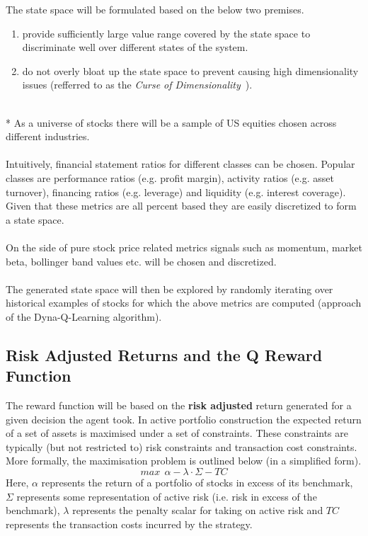 \documentclass[dvips,12pt]{article}
\begin{document}
The state space will be formulated based on the below two premises.
\begin{enumerate}
	\item provide sufficiently large value range covered by the state space to discriminate well over different states of the system.
	\item do not overly bloat up the state space to prevent causing high dimensionality issues (refferred to as the \emph{Curse of Dimensionality}~\cite{rojas2015}).
\end{enumerate}
~\\*
As a universe of stocks there will be a sample of US equities chosen across different industries.
\\\\
Intuitively, financial statement ratios for different classes can be chosen. Popular classes are performance ratios (e.g. profit margin), activity ratios (e.g. asset turnover), financing ratios (e.g. leverage) and liquidity (e.g. interest coverage). Given that these metrics are all percent based they are easily discretized to form a state space.
\\\\
On the side of pure stock price related metrics signals such as momentum, market beta, bollinger band values etc. will be chosen and discretized.
\\\\
The generated state space will then be explored by randomly iterating over historical examples of stocks for which the above metrics are computed (approach of the Dyna-Q-Learning algorithm). 

\subsection*{Risk Adjusted Returns and the Q Reward Function}
The reward function will be based on the \textbf{risk adjusted} return generated for a given decision the agent took.
In active portfolio construction the expected return of a set of assets is maximised under a set of constraints. These constraints are typically (but not restricted to) risk constraints and transaction cost constraints. More formally, the maximisation problem is outlined below (in a simplified form)\cite{grinoldkahn1999}.
\begin{equation}
	max~~\alpha - \lambda \cdot \Sigma - TC
\end{equation}
Here, $\alpha$ represents the return of a portfolio of stocks in excess of its benchmark, $\Sigma$ represents some representation of active risk (i.e. risk in excess of the benchmark), $\lambda$ represents the penalty scalar for taking on active risk and $TC$ represents the transaction costs incurred by the strategy.
\end{document}
